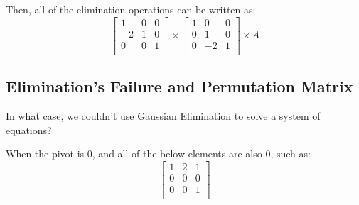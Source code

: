         Then, all of the elimination operations can be written as:
                \begin{equation}
                    \begin{bmatrix}
                        1 & 0 & 0 \\
                        -2 & 1 & 0 \\
                        0 & 0 & 1 \\
                    \end{bmatrix}
                    \times
                    \begin{bmatrix}
                        1 & 0 & 0 \\
                        0 & 1 & 0 \\
                        0 & -2 & 1 \\
                    \end{bmatrix}
                    \times
                    A
                \end{equation}

    \subsection{Elimination's Failure and Permutation Matrix}
        In what case, we couldn't use Gaussian Elimination to solve a system of equations?

        When the pivot is 0, and all of the below elements are also 0, such as:
                \begin{equation}
                    \begin{bmatrix}
                        1 & 2 & 1 \\
                        0 & 0 & 0 \\
                        0 & 0 & 1 \\
                    \end{bmatrix}
                \end{equation}
        
